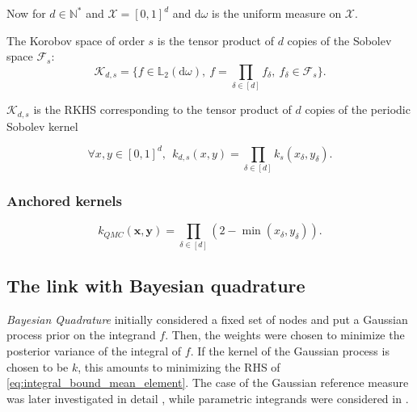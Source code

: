 \documentclass[twoside,11pt]{book}
\begin{document}
Now for $d \in \mathbb{N}^{*}$ and $\mathcal{X} = [0,1]^{d}$ and $\mathrm{d}\omega$ is the uniform measure on $\mathcal{X}$. 

The Korobov space of order $s$ is the tensor product of $d$ copies of the Sobolev space $\mathcal{F}_{s}$:
\begin{equation}
\mathcal{K}_{d,s} = \{ f \in \mathbb{L}_{2}(\mathrm{d}\omega), \: f = \prod\limits_{\delta \in [d]} f_{\delta}, \: f_{\delta} \in \mathcal{F}_{s} \}.
\end{equation}

$\mathcal{K}_{d,s}$ is the RKHS corresponding to the tensor product of $d$ copies of the periodic Sobolev kernel

\begin{equation}
\forall x,y \in [0,1]^{d}, \:\: k_{d,s}(x,y) = \prod\limits_{\delta \in [d]}k_{s}(x_{\delta},y_{\delta}).
\end{equation}


\subsubsection{Anchored kernels}

\begin{equation}
k_{QMC}(\bm{x},\bm{y}) = \prod\limits_{\delta \in [d]} (2-\min(x_{\delta},y_{\delta})).
\end{equation}






\subsection{The link with Bayesian quadrature}
\label{subsec:bayesian_quadrature}
\emph{Bayesian Quadrature} initially \citep{Lar72} considered a fixed set of nodes and put a Gaussian process prior on the integrand $f$. Then, the weights were chosen to minimize the posterior variance of the integral of $f$. If the kernel of the Gaussian process is chosen to be $k$, this amounts to minimizing the RHS of \eqref{eq:integral_bound_mean_element}. The case of the Gaussian reference measure was later investigated in detail \citep{Hag91}, while parametric integrands were considered in \citep{Min00}.
\end{document}
